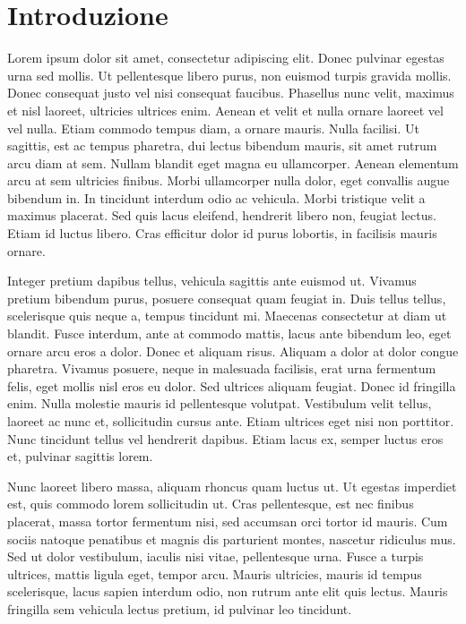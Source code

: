 \chapter{Introduzione}

Lorem ipsum dolor sit amet, consectetur adipiscing elit. Donec pulvinar egestas urna sed mollis. Ut pellentesque libero purus, non euismod turpis gravida mollis. Donec consequat justo vel nisi consequat faucibus. Phasellus nunc velit, maximus et nisl laoreet, ultricies ultrices enim. Aenean et velit et nulla ornare laoreet vel vel nulla. Etiam commodo tempus diam, a ornare mauris. Nulla facilisi. Ut sagittis, est ac tempus pharetra, dui lectus bibendum mauris, sit amet rutrum arcu diam at sem. Nullam blandit eget magna eu ullamcorper. Aenean elementum arcu at sem ultricies finibus. Morbi ullamcorper nulla dolor, eget convallis augue bibendum in. In tincidunt interdum odio ac vehicula. Morbi tristique velit a maximus placerat. Sed quis lacus eleifend, hendrerit libero non, feugiat lectus. Etiam id luctus libero. Cras efficitur dolor id purus lobortis, in facilisis mauris ornare.

Integer pretium dapibus tellus, vehicula sagittis ante euismod ut. Vivamus pretium bibendum purus, posuere consequat quam feugiat in. Duis tellus tellus, scelerisque quis neque a, tempus tincidunt mi. Maecenas consectetur at diam ut blandit. Fusce interdum, ante at commodo mattis, lacus ante bibendum leo, eget ornare arcu eros a dolor. Donec et aliquam risus. Aliquam a dolor at dolor congue pharetra. Vivamus posuere, neque in malesuada facilisis, erat urna fermentum felis, eget mollis nisl eros eu dolor. Sed ultrices aliquam feugiat. Donec id fringilla enim. Nulla molestie mauris id pellentesque volutpat. Vestibulum velit tellus, laoreet ac nunc et, sollicitudin cursus ante. Etiam ultrices eget nisi non porttitor. Nunc tincidunt tellus vel hendrerit dapibus. Etiam lacus ex, semper luctus eros et, pulvinar sagittis lorem.

Nunc laoreet libero massa, aliquam rhoncus quam luctus ut. Ut egestas imperdiet est, quis commodo lorem sollicitudin ut. Cras pellentesque, est nec finibus placerat, massa tortor fermentum nisi, sed accumsan orci tortor id mauris. Cum sociis natoque penatibus et magnis dis parturient montes, nascetur ridiculus mus. Sed ut dolor vestibulum, iaculis nisi vitae, pellentesque urna. Fusce a turpis ultrices, mattis ligula eget, tempor arcu. Mauris ultricies, mauris id tempus scelerisque, lacus sapien interdum odio, non rutrum ante elit quis lectus. Mauris fringilla sem vehicula lectus pretium, id pulvinar leo tincidunt.